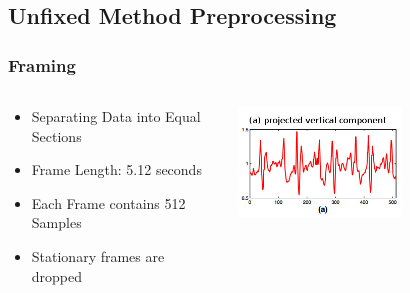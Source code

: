 \documentclass{beamer}
\begin{document}
\subsection{Unfixed Method Preprocessing}
\begin{frame}
  \frametitle{Framing}
  \begin{columns}
  \begin{column}{0.65\textwidth}
  	\begin{itemize}
  		\item Separating Data into Equal Sections    
  		\linebreak
  		\item Frame Length: 5.12 seconds       
  		\linebreak
  		\item Each Frame contains 512 Samples
  		\linebreak
  		\item Stationary frames are dropped                
  	\end{itemize}
  \end{column}
  \begin{column}{0.6\textwidth}
   \includegraphics[width=0.6\textwidth]{Illustrations/frame.jpg}
       \\
  \end{column}
  
  \end{columns}
\end{frame}
\end{document}
